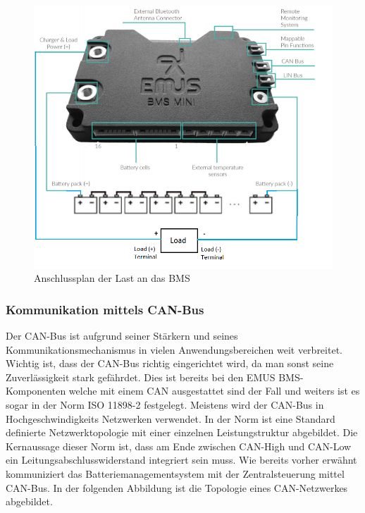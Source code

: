 \begin{figure}[H]
	\begin{center}
		\includegraphics[scale=0.7]{figures/Akku/SystemStrukturBMSLast.png}
		\caption{Anschlussplan der Last an das BMS}
	\end{center}
\end{figure}
\newpage

\subsubsection{Kommunikation mittels CAN-Bus}

Der CAN-Bus ist aufgrund seiner Stärkern und seines Kommunikationsmechanismus in vielen Anwendungsbereichen weit verbreitet. Wichtig ist, dass der CAN-Bus richtig eingerichtet wird, da man sonst seine Zuverlässigkeit stark gefährdet. Dies ist bereits bei den EMUS BMS-Komponenten welche mit einem CAN ausgestattet sind der Fall und weiters ist es sogar in der Norm ISO 11898-2 festgelegt. Meistens wird der CAN-Bus in Hochgeschwindigkeits Netzwerken verwendet. In der Norm ist eine Standard definierte Netzwerktopologie mit einer einzelnen Leistungstruktur abgebildet. Die Kernaussage dieser Norm ist, dass am Ende zwischen CAN-High und CAN-Low ein Leitungsabschlusswiderstand integriert sein muss. Wie bereits vorher erwähnt kommuniziert das Batteriemanagementsystem mit der Zentralsteuerung mittel CAN-Bus. In der folgenden Abbildung ist die Topologie eines CAN-Netzwerkes abgebildet.

